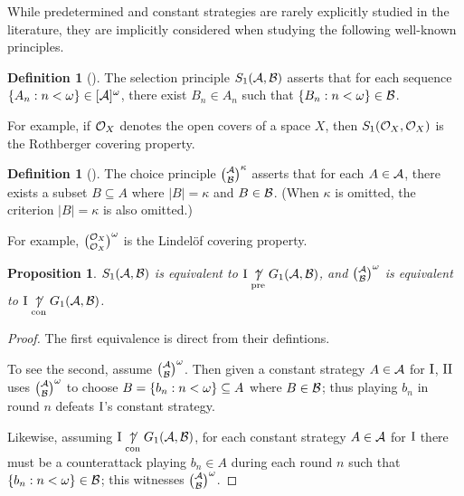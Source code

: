 \documentclass{amsart}
\theoremstyle{plain}
\newtheorem{proposition}[theorem]{Proposition}
\theoremstyle{definition}
\newtheorem{definition}[theorem]{Definition}
\theoremstyle{remark}
\theoremstyle{plain}
\theoremstyle{definition}
\theoremstyle{remark}
\begin{document}
While predetermined and constant strategies are rarely explicitly studied in the literature,
they are implicitly considered when studying the following well-known principles.

\begin{definition}[\cite{MR1378387}]
  The selection principle \(S_{1}(\mathcal{A},\mathcal{B})\) asserts
  that for each sequence \(\left\{A_n:n<\omega\right\}\in[\mathcal{A}]^\omega\),
  there exist \(B_n\in A_n\) such that \(\left\{B_n:n<\omega\right\}\in\mathcal{B}\).
\end{definition}

For example, if \(\mathcal{O}_X\) denotes the open covers of a space \(X\), 
then \(S_{1}(\mathcal{O}_X,\mathcal{O}_X)\) is the Rothberger covering property.

\begin{definition}[\cite{MR2363173}]
  The choice principle \(\binom{\mathcal{A}}{\mathcal{B}}^\kappa\) asserts
  that for each \(A\in \mathcal{A}\), there exists a subset
  \(B\subseteq A\) where \(|B|=\kappa\) and \(B\in\mathcal{B}\).
  (When \(\kappa\) is omitted, the criterion \(|B|=\kappa\) is also omitted.)
\end{definition}

For example,
\(\binom{\mathcal{O}_X}{\mathcal{O}_X}^\omega\) is the Lindel\"of covering property.

\begin{proposition}
  \(S_{1}(\mathcal{A},\mathcal{B})\) is equivalent to
  \(\mathrm{I}\underset{\text{pre}}{\not\uparrow} G_{1}(\mathcal{A},\mathcal{B})\), and
  \(\binom{\mathcal{A}}{\mathcal{B}}^\omega\) is equivalent to
  \(\mathrm{I}\underset{\text{con}}{\not\uparrow} G_{1}(\mathcal{A},\mathcal{B})\).
\end{proposition}

\begin{proof}
  The first equivalence is direct from their defintions.

  To see the second,
  assume \(\binom{\mathcal{A}}{\mathcal{B}}^\omega\). Then given a constant strategy
  \(A\in\mathcal{A}\) for \(\mathrm{I}\), \(\mathrm{II}\) uses \(\binom{\mathcal{A}}{\mathcal{B}}^\omega\) to
  choose \(B=\left\{b_n:n<\omega\right\}\subseteq A\) where \(B\in\mathcal{B}\); thus
  playing \(b_n\) in round
  \(n\) defeats \(\mathrm{I}\)'s constant strategy.

  Likewise, assuming 
  \(\mathrm{I}\underset{\text{con}}{\not\uparrow} G_{1}(\mathcal{A},\mathcal{B})\), for each constant strategy
  \(A\in\mathcal{A}\) for \(\mathrm{I}\) there must be a counterattack playing \(b_n\in A\)
  during each round \(n\) such that \(\left\{b_n:n<\omega\right\}\in\mathcal{B}\); this witnesses
  \(\binom{\mathcal{A}}{\mathcal{B}}^\omega\).
\end{proof}
\end{document}
